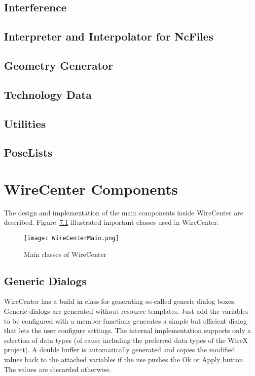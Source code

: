 \documentclass[11pt,a4paper,onepage,openany]{book}
\begin{document}
\section{Interference}

\section{Interpreter and Interpolator for NcFiles}

\section{Geometry Generator}

\section{Technology Data}

\section{Utilities}

\section{PoseLists}

\chapter{WireCenter Components}
The design and implementation of the main components inside WireCenter are
described. Figure~\ref{fig:WireCenterClasses} illustrated important classes used
in WireCenter.
\begin{figure}
  \centering
  \texttt{[image: WireCenterMain.png]}
  \caption{Main classes of WireCenter}\label{fig:WireCenterClasses}
\end{figure}


\section{Generic Dialogs}
WireCenter has a build in class for generating so-called generic dialog boxes.
Generic dialogs are generated without resource templates. Just add the
variables to be configured with a member functions generates a simple but
efficient dialog that lets the user configure settings. The internal
implementation supports only a selection of data types (of cause including the
preferred data types of the WireX project). A double buffer is automatically
generated and copies the modified values back to the attached variables if the
use pushes the Ok or Apply button. The values are discarded otherwise.
\end{document}
